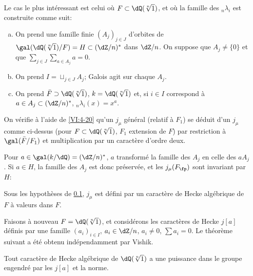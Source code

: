 \subsection{}\label{VI:6-9}

Le cas le plus intéressant est celui où $F\subset \dQ(\sqrt[n]{1})$, et 
où la famille des $_n \lambda_i$ est construite comme suit: 
\begin{enumerate}[a)]
  \item On prend une famille finie $(A_j)_{j\in J}$ d'orbites de 
    $\gal(\dQ(\sqrt[n]{1})/F)=H\subset (\dZ/n)^\ast$ dans $\dZ/n$. On suppose que 
    $A_j\ne\{0\}$ et que $\sum_{j\in J} \sum_{a\in A_j} a=0$. 
\item On prend $I=\sqcup_{j\in J} A_j$; Galois agit sur chaque $A_j$. 
  \item On prend $\bar F\supset \dQ(\sqrt[n]{1})$, $k=\dQ(\sqrt[n]{1})$ et, si 
    $i\in I$ correspond à $a\in A_j\subset (\dZ/n)^\ast$, 
    $_n\lambda_i(x)=x^a$. 
\end{enumerate}

On vérifie à l'aide de \ref{VI:4-20} qu'un $j_\mu$ général (relatif à 
$F_1$) se déduit d'un $j_\mu$ comme ci-dessus (pour 
$F\subset \dQ(\sqrt[n]{1})$, $F_1$ extension de $F$) par restriction à 
$\gal(\bar F/F_1)$ et multiplication par un caractère d'ordre deux. 

Pour $a\in \gal(k/\dQ)=(\dZ/n)^\ast$, $a$ transformé la famille des $A_j$ 
en celle des $a A_j$. Si $a\in H$, la famille des $A_j$ est donc préservée, 
et les $j_\mu(F_\fp)$ sont invariant par $H$: 





\begin{proposition_}\label{VI:6-10}
Sous les hypothèses de \ref{VI:6-9}, $j_\mu$ est défini par un caractère 
de Hecke algébrique de $F$ à valeurs dans $F$. 
\end{proposition_}

Faisons à nouveau $F=\dQ(\sqrt[n]{1})$, et considérons les caractères de 
Hecke $j[a]$ définis par une famille $(a_i)_{i\in I}$, $a_i\in \dZ/n$, 
$a_i\ne 0$, $\sum a_i=0$. Le théorème suivant a été obtenu 
indépendamment par Vishik. 





\begin{theorem_}\label{VI:6-11}
Tout caractère de Hecke algébrique de $\dQ(\sqrt[n]{1})$ a une puissance 
dans le groupe engendré par les $j[a]$ et la norme. 
\end{theorem_}

